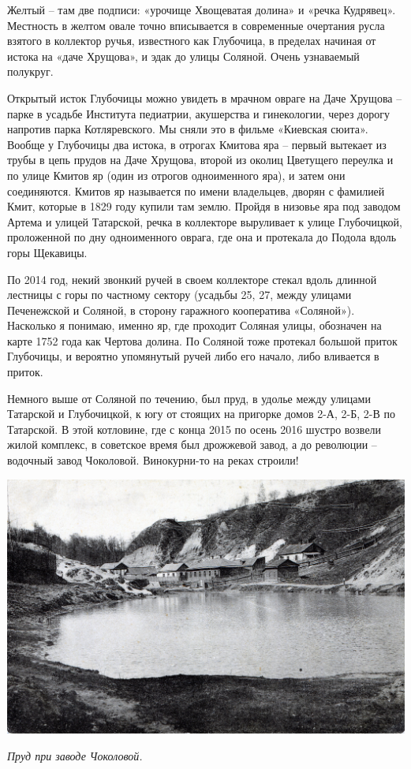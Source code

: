 Желтый – там две подписи: «урочище Хвощеватая долина» и «речка Кудрявец». Местность в желтом овале точно вписывается в современные очертания русла взятого в коллектор ручья, известного как Глубочица, в пределах начиная от истока на «даче Хрущова», и эдак до улицы Соляной. Очень узнаваемый полукруг.

Открытый исток Глубочицы можно увидеть в мрачном овраге на Даче Хрущова – парке в усадьбе Института педиатрии, акушерства и гинекологии, через дорогу напротив парка Котляревского. Мы сняли это в фильме «Киевская сюита». Вообще у Глубочицы два истока, в отрогах Кмитова яра – первый вытекает из трубы в цепь прудов на Даче Хрущова, второй из околиц Цветущего переулка и по улице Кмитов яр (один из отрогов одноименного яра), и затем они соединяются. Кмитов яр называется по имени владельцев, дворян с фамилией Кмит, которые в 1829 году купили там землю. Пройдя в низовье яра под заводом Артема и улицей Татарской, речка в коллекторе выруливает к улице Глубочицкой, проложенной по дну одноименного оврага, где она и протекала до Подола вдоль горы Щекавицы.


По 2014 год, некий звонкий ручей в своем коллекторе стекал вдоль длинной лестницы с горы по частному сектору (усадьбы 25, 27, между улицами Печенежской и Соляной, в сторону гаражного кооператива «Соляной»). Насколько я понимаю, именно яр, где проходит Соляная улицы, обозначен на карте 1752 года как Чертова долина. По Соляной тоже протекал большой приток Глубочицы, и вероятно упомянутый ручей либо его начало, либо вливается в приток.

Немного выше от Соляной по течению, был пруд, в удолье между улицами Татарской и Глубочицкой, к югу от стоящих на пригорке домов 2-А, 2-Б, 2-В по Татарской. В этой котловине, где с конца 2015 по осень 2016 шустро возвели жилой комплекс, в советское время был дрожжевой завод, а до революции – водочный завод Чоколовой. Винокурни-то на реках строили!
\vspace*{\fill}
\begin{center}
\includegraphics[width=\linewidth]{chast-colebanie-osnov/pochayna/tatarsk-stavok.jpg}

\textit{Пруд при заводе Чоколовой.}
\end{center}
\vspace*{\fill}
\newpage

